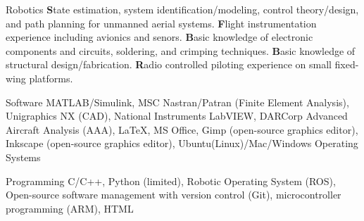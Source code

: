 

\begin{cvskills}

  \cvskill
    {Robotics} %
    {\textbf{S}tate estimation, system identification/modeling, control theory/design, and path planning for unmanned aerial systems. \textbf{F}light instrumentation experience including avionics and senors. \textbf{B}asic knowledge of electronic components and circuits, soldering, and crimping techniques. \textbf{B}asic knowledge of structural design/fabrication. \textbf{R}adio controlled piloting experience on small fixed-wing platforms.}

  \cvskill
    {Software} %
    {MATLAB/Simulink, MSC Nastran/Patran (Finite Element Analysis), Unigraphics NX (CAD), National Instruments LabVIEW, DARCorp Advanced Aircraft Analysis (AAA), LaTeX, MS Office, Gimp (open-source graphics editor), Inkscape (open-source graphics editor), Ubuntu(Linux)/Mac/Windows Operating Systems} %

  \cvskill
    {Programming} %
    {C/C++, Python (limited), Robotic Operating System (ROS), Open-source software management with version control (Git), microcontroller programming (ARM), HTML} %


\end{cvskills}
